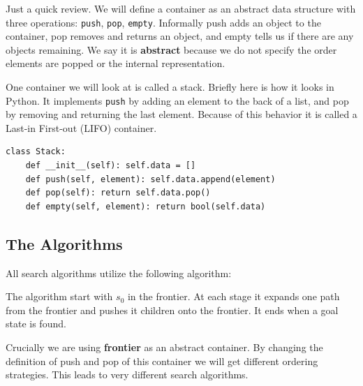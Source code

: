 \documentclass[11pt]{article}
\begin{document}
Just a quick review. We will define a container as an abstract data
structure with three operations: \texttt{push}, \texttt{pop},
\texttt{empty}. Informally push adds an object to the container, pop
removes and returns an object, and empty tells us if there are any
objects remaining. We say it is \textbf{abstract} because we do not
specify the order elements are popped or the internal representation.

One container we will look at is called a stack. Briefly here is how it looks 
in Python. It implements \texttt{push} by adding an element to the back of a list,
and pop by removing and returning the last element. Because of this behavior it 
is called a Last-in First-out (LIFO) container.  

\begin{lstlisting}
class Stack:
    def __init__(self): self.data = []
    def push(self, element): self.data.append(element)
    def pop(self): return self.data.pop() 
    def empty(self, element): return bool(self.data) 
\end{lstlisting}


\subsection{The Algorithms}

All search algorithms utilize the following algorithm:

\begin{algorithm}

\begin{algorithmic}[1]
  \EndIf{}
  \EndFor{}
  \EndWhile{}
  \EndProcedure{}
\end{algorithmic}
\end{algorithm}

The algorithm start with $s_0$ in the frontier. At each stage it expands one path
from the frontier and pushes it children onto the frontier. It ends when a goal 
state is found.

Crucially we are using \textbf{frontier} as an abstract container. By
changing the definition of push and pop of this container we will get
different ordering strategies. This leads to very different search algorithms.
\end{document}
